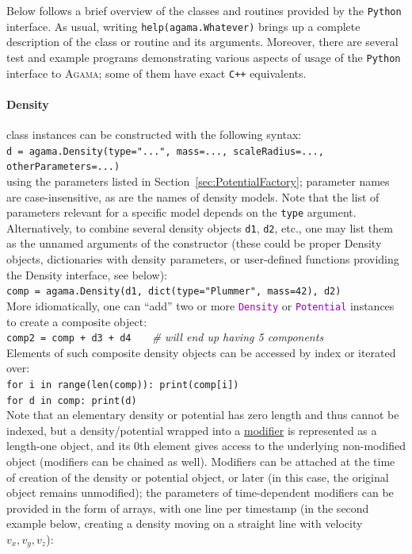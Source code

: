 \documentclass[12pt]{article}
\newcommand{\Agama}{\textsc{Agama}\xspace}
\newcommand{\Cpp}  {\texttt{C++}\xspace}
\newcommand{\Python}{\texttt{Python}\xspace}
\newcommand{\ttt}[1]{\textcolor{darkviolet}{\texttt{#1}}}
\let\oldparagraph\paragraph
\renewcommand{\paragraph}[1]{\vspace{-2mm}\oldparagraph{#1}}
\begin{document}
Below follows a brief overview of the classes and routines provided by the \Python interface.
As usual, writing \texttt{help(agama.Whatever)} brings up a complete description of the class or routine and its arguments. Moreover, there are several test and example programs demonstrating various aspects of usage of the \Python interface to \Agama; some of them have exact \Cpp equivalents.

\paragraph{Density} class instances can be constructed with the following syntax: \\
\texttt{d = agama.Density(type="...", mass=..., scaleRadius=..., otherParameters=...)}\\
using the parameters listed in Section~\ref{sec:PotentialFactory}; parameter names are case-insensitive, as are the names of density models. Note that the list of parameters relevant for a specific model depends on the \texttt{type} argument.
Alternatively, to combine several density objects \texttt{d1}, \texttt{d2}, etc., one may list them as the unnamed arguments of the constructor (these could be proper Density objects, dictionaries with density parameters, or user-defined functions providing the Density interface, see below):\\
\texttt{comp = agama.Density(d1, dict(type="Plummer", mass=42), d2)}\\[2mm]
More idiomatically, one can ``add'' two or more \ttt{Density} or \ttt{Potential} instances to create a composite object:\\
\texttt{comp2 = comp + d3 + d4}\textit{\color{Sepia} \ \ \ \# will end up having 5 components}\\[2mm]
Elements of such composite density objects can be accessed by index or iterated over:\\
\texttt{for i in range(len(comp)): print(comp[i])}\\
\texttt{for d in comp: print(d)}\\[2mm]
Note that an elementary density or potential has zero length and thus cannot be indexed, but a density/potential wrapped into a \hyperref[sec:PotentialModifiers]{modifier} is represented as a length-one object, and its 0th element gives access to the underlying non-modified object (modifiers can be chained as well). Modifiers can be attached at the time of creation of the density or potential object, or later (in this case, the original object remains unmodified); the parameters of time-dependent modifiers can be provided in the form of arrays, with one line per timestamp (in the second example below, creating a density moving on a straight line with velocity $v_x,v_y,v_z$):\\
\end{document}
